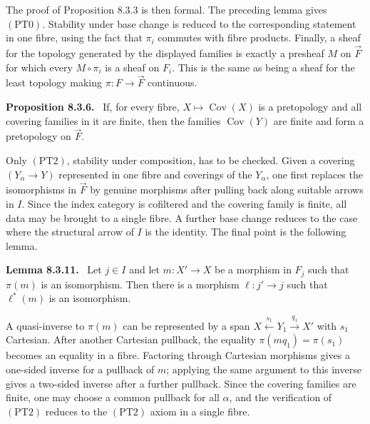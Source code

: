 \documentclass[11pt]{article}
\newenvironment{statement}[1]{\par\medskip\noindent\textbf{#1.}\ }{\par\medskip}
\begin{document}
The proof of Proposition 8.3.3 is then formal. The preceding lemma gives \((\mathrm{PT0})\). Stability under base change is reduced to the corresponding statement in one fibre, using the fact that \(\pi_i\) commutes with fibre products. Finally, a sheaf for the topology generated by the displayed families is exactly a presheaf \(M\) on \(\overrightarrow F\) for which every \(M\circ\pi_i\) is a sheaf on \(F_i\). This is the same as being a sheaf for the least topology making \(\pi:F\to\overrightarrow F\) continuous.

\begin{statement}{Proposition 8.3.6}
If, for every fibre, \(X\mapsto\operatorname{Cov}(X)\) is a pretopology and all covering families in it are finite, then the families \(\operatorname{Cov}(Y)\) are finite and form a pretopology on \(\overrightarrow F\).
\end{statement}
Only \((\mathrm{PT2})\), stability under composition, has to be checked. Given a covering \((Y_\alpha\to Y)\) represented in one fibre and coverings of the \(Y_\alpha\), one first replaces the isomorphisms in \(\overrightarrow F\) by genuine morphisms after pulling back along suitable arrows in \(I\). Since the index category is cofiltered and the covering family is finite, all data may be brought to a single fibre. A further base change reduces to the case where the structural arrow of \(I\) is the identity. The final point is the following lemma.

\begin{statement}{Lemma 8.3.11}
Let \(j\in I\) and let \(m:X'\to X\) be a morphism in \(F_j\) such that \(\pi(m)\) is an isomorphism. Then there is a morphism \(\ell:j'\to j\) such that \(\ell^*(m)\) is an isomorphism.
\end{statement}
A quasi-inverse to \(\pi(m)\) can be represented by a span \(X\xleftarrow{s_1}Y_1\xrightarrow{q_1}X'\) with \(s_1\) Cartesian. After another Cartesian pullback, the equality \(\pi(mq_1)=\pi(s_1)\) becomes an equality in a fibre. Factoring through Cartesian morphisms gives a one-sided inverse for a pullback of \(m\); applying the same argument to this inverse gives a two-sided inverse after a further pullback. Since the covering families are finite, one may choose a common pullback for all \(\alpha\), and the verification of \((\mathrm{PT2})\) reduces to the \((\mathrm{PT2})\) axiom in a single fibre.
\end{document}
